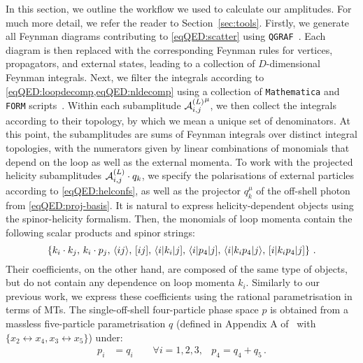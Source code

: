 \documentclass[main.tex]{subfiles}
\begin{document}
In this section, we outline the workflow we used to calculate our amplitudes. For much more detail, we refer the reader to Section~\ref{sec:tools}. Firstly, we generate all Feynman diagrams contributing to \cref{eqQED:scatter} using \texttt{QGRAF}~\cite{Nogueira:1991ex}. Each diagram is then replaced with the corresponding Feynman rules for vertices, propagators, and external states, leading to a collection of $D$-dimensional Feynman integrals. Next, we filter the integrals according to \cref{eqQED:loopdecomp,eqQED:nldecomp} using a collection of \texttt{Mathematica} and \texttt{FORM} scripts~\cite{Kuipers:2012rf,
Ruijl:2017dtg}. Within each subamplitude ${\mathcal{A}^{(L)}_{i, j}}^{\mu}$, we then collect the integrals according to their topology, by which we mean a unique set of denominators. 
At this point, the subamplitudes are sums of Feynman integrals over distinct integral topologies, with the numerators given by linear combinations of monomials that depend on the loop as well as the external momenta. To work with the projected helicity subamplitudes $\mathcal{A}^{(L)}_{i,j}\cdot q_k$, we specify the polarisations of external particles according to \cref{eqQED:helconfs}, as well as the projector $q_k^\mu$ of the off-shell photon from \cref{eqQED:proj-basis}. It is natural to express helicity-dependent objects using the spinor-helicity formalism. Then, the monomials of loop momenta contain the following scalar products and spinor strings:
\begin{equation} \label{eqQED:loopmomobjects}
	\left\{ k_i \cdot k_j, \,
    k_i \cdot p_j ,\,
    \langle ij \rangle,\,
    [ ij ],\,
    \langle i |k_i |j],\,
    \langle i |p_4 |j],\,
    \langle i|k_i p_4|j \rangle,\,
    [i| k_i p_4 |j] \right\} \,.
\end{equation}
Their coefficients, on the other hand, are composed of the same type of
objects, but do not contain any dependence on loop momenta $k_i$.  Similarly to our previous work, we express these coefficients using the rational parametrisation in terms of MTs. The single-off-shell four-particle phase space $p$ is obtained from a massless five-particle parametrisation $q$ (defined in Appendix A of~ with $\{x_2\leftrightarrow x_4,x_3\leftrightarrow x_5\}$) under:
\begin{align}
    p_i &= q_i \qquad \forall i=1,2,3, & p_4=q_4+q_5 \, .
\end{align}
\end{document}
